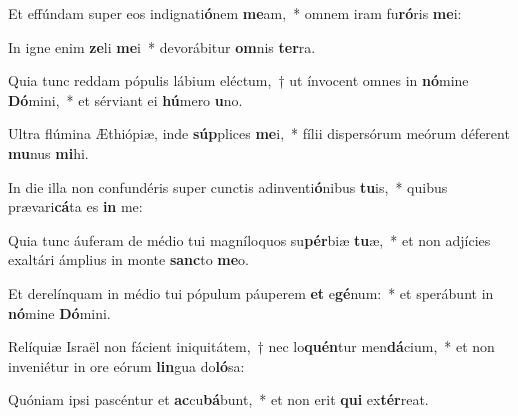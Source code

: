 \item Et effúndam super eos indignati\textbf{ó}nem \textbf{me}am,~* omnem iram fu\textbf{ró}ris \textbf{me}i:
\item In igne enim \textbf{ze}li \textbf{me}i~* devorábitur \textbf{om}nis \textbf{ter}ra.
\item Quia tunc reddam pópulis lábium eléctum,~† ut ínvocent omnes in \textbf{nó}mine \textbf{Dó}mini,~* et sérviant ei \textbf{hú}mero \textbf{u}no.
\item Ultra flúmina Æthiópiæ, inde \textbf{súp}plices \textbf{me}i,~* fílii dispersórum meórum déferent \textbf{mu}nus \textbf{mi}hi.
\item In die illa non confundéris super cunctis adinventi\textbf{ó}nibus \textbf{tu}is,~* quibus prævari\textbf{cá}ta es \textbf{in} me:
\item Quia tunc áuferam de médio tui magníloquos su\textbf{pér}biæ \textbf{tu}æ,~* et non adjícies exaltári ámplius in monte \textbf{sanc}to \textbf{me}o.
\item Et derelínquam in médio tui pópulum páuperem \textbf{et} e\textbf{gé}num:~* et sperábunt in \textbf{nó}mine \textbf{Dó}mini.
\item Relíquiæ Israël non fácient iniquitátem,~† nec lo\textbf{quén}tur men\textbf{dá}cium,~* et non inveniétur in ore eórum \textbf{lin}gua do\textbf{ló}sa:
\item Quóniam ipsi pascéntur et \textbf{ac}cu\textbf{bá}bunt,~* et non erit \textbf{qui} ex\textbf{tér}reat.
